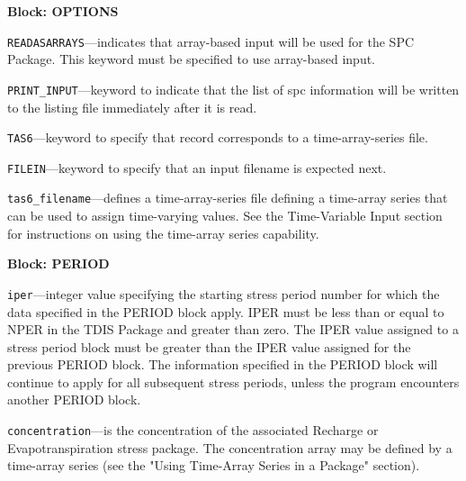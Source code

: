 
\item \textbf{Block: OPTIONS}

\begin{description}
\item \texttt{READASARRAYS}---indicates that array-based input will be used for the SPC Package.  This keyword must be specified to use array-based input.

\item \texttt{PRINT\_INPUT}---keyword to indicate that the list of spc information will be written to the listing file immediately after it is read.

\item \texttt{TAS6}---keyword to specify that record corresponds to a time-array-series file.

\item \texttt{FILEIN}---keyword to specify that an input filename is expected next.

\item \texttt{tas6\_filename}---defines a time-array-series file defining a time-array series that can be used to assign time-varying values. See the Time-Variable Input section for instructions on using the time-array series capability.

\end{description}
\item \textbf{Block: PERIOD}

\begin{description}
\item \texttt{iper}---integer value specifying the starting stress period number for which the data specified in the PERIOD block apply.  IPER must be less than or equal to NPER in the TDIS Package and greater than zero.  The IPER value assigned to a stress period block must be greater than the IPER value assigned for the previous PERIOD block.  The information specified in the PERIOD block will continue to apply for all subsequent stress periods, unless the program encounters another PERIOD block.

\item \texttt{concentration}---is the concentration of the associated Recharge or Evapotranspiration stress package.  The concentration array may be defined by a time-array series (see the "Using Time-Array Series in a Package" section).

\end{description}

